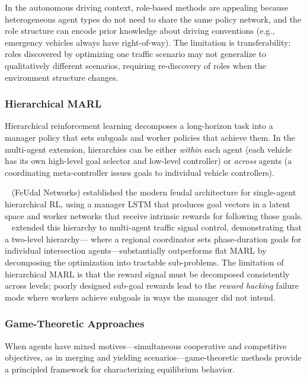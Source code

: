 \documentclass[12pt, a4paper]{article}
\begin{document}
In the autonomous driving context, role-based methods are appealing because
heterogeneous agent types do not need to share the same policy network, and
the role structure can encode prior knowledge about driving conventions (e.g.,
emergency vehicles always have right-of-way).  The limitation is
transferability: roles discovered by optimizing one traffic scenario may not
generalize to qualitatively different scenarios, requiring re-discovery of
roles when the environment structure changes.

\subsubsection{Hierarchical MARL}

Hierarchical reinforcement learning decomposes a long-horizon task into a
manager policy that sets subgoals and worker policies that achieve them.  In
the multi-agent extension, hierarchies can be either \emph{within} each agent
(each vehicle has its own high-level goal selector and low-level controller)
or \emph{across} agents (a coordinating meta-controller issues goals to
individual vehicle controllers).

\citeauthor{vezhnevets2017feudal}~\cite{vezhnevets2017feudal} (FeUdal Networks)
established the modern feudal architecture for single-agent hierarchical RL,
using a manager LSTM that produces goal vectors in a latent space and worker
networks that receive intrinsic rewards for following those goals.
\citeauthor{chu2020multi}~\cite{chu2020multi} extended this hierarchy to
multi-agent traffic signal control, demonstrating that a two-level hierarchy---
where a regional coordinator sets phase-duration goals for individual
intersection agents---substantially outperforms flat MARL by decomposing the
optimization into tractable sub-problems.  The limitation of hierarchical MARL
is that the reward signal must be decomposed consistently across levels; poorly
designed sub-goal rewards lead to the \emph{reward hacking} failure mode where
workers achieve subgoals in ways the manager did not intend.

\subsubsection{Game-Theoretic Approaches}

When agents have mixed motives---simultaneous cooperative and competitive
objectives, as in merging and yielding scenarios---game-theoretic methods
provide a principled framework for characterizing equilibrium behavior.
\end{document}
